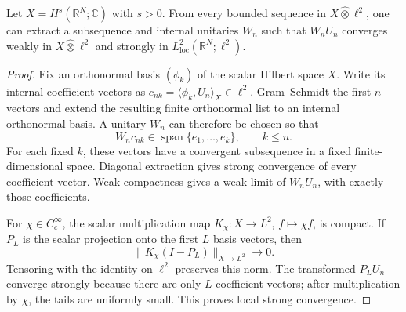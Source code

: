 \begin{lemma}
\label{lem:r11-internalcompact}
Let $X=H^s(\mathbb R^N;\mathbb C)$ with $s>0$. From every bounded
sequence in $X\widehat\otimes\ell^2$, one can extract a subsequence
and internal unitaries $W_n$ such that $W_nU_n$ converges weakly in
$X\widehat\otimes\ell^2$ and strongly in
$L^2_{\mathrm{loc}}(\mathbb R^N;\ell^2)$.
\end{lemma}
\begin{proof}
Fix an orthonormal basis $(\phi_k)$ of the scalar Hilbert space $X$.
Write its internal coefficient vectors as
$c_{nk}=\langle\phi_k,U_n\rangle_X\in\ell^2$.
Gram--Schmidt the first $n$ vectors and extend the resulting finite
orthonormal list to an internal orthonormal basis. A unitary $W_n$
can therefore be chosen so that
\[
 W_nc_{nk}\in\operatorname{span}\{e_1,\ldots,e_k\},\qquad k\le n.
\]
For each fixed $k$, these vectors have a convergent subsequence in a
fixed finite-dimensional space. Diagonal extraction gives strong
convergence of every coefficient vector. Weak compactness gives a
weak limit of $W_nU_n$, with exactly those coefficients.

For $\chi\in C_c^\infty$, the scalar multiplication map
$K_\chi:X\to L^2$, $f\mapsto\chi f$, is compact. If $P_L$ is the
scalar projection onto the first $L$ basis vectors, then
\[
 \|K_\chi(I-P_L)\|_{X\to L^2}\longrightarrow0.
\]
Tensoring with the identity on $\ell^2$ preserves this norm.
The transformed $P_LU_n$ converge strongly because there are only
$L$ coefficient vectors; after multiplication by $\chi$, the tails
are uniformly small. This proves local strong convergence.
\end{proof}

